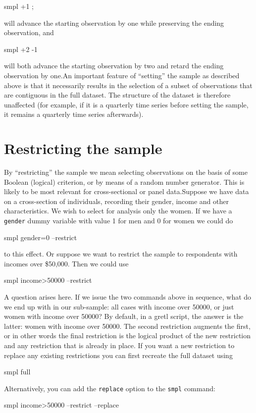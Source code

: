       
\begin{code}
	smpl +1 ;
\end{code}
will advance the starting observation by one while preserving the
ending observation, and

      
\begin{code}
	smpl +2 -1
\end{code}
will both advance the starting observation by two and retard the
ending observation by one.An important feature of ``setting'' the
sample as described above is that it necessarily results in the
selection of a subset of observations that are contiguous in the full
dataset. The structure of the dataset is therefore unaffected (for
example, if it is a quarterly time series before setting the sample,
it remains a quarterly time series afterwards).

\section{Restricting the sample}
\label{sample-restrict}

By ``restricting'' the sample we mean selecting observations on the
basis of some Boolean (logical) criterion, or by means of a random
number generator.  This is likely to be most relevant for
cross-sectional or panel data.Suppose we have data on a cross-section
of individuals, recording their gender, income and other
characteristics.  We wish to select for analysis only the women.  If
we have a \verb+gender+ dummy variable with value 1 for men and 0 for
women we could do
%      
\begin{code}
	smpl gender=0 --restrict
\end{code}
%
to this effect.  Or suppose we want to restrict the sample to
respondents with incomes over \$50,000.  Then we could use
%
\begin{code}
	smpl income>50000 --restrict
\end{code}

A question arises here.  If we issue the two commands above in
sequence, what do we end up with in our sub-sample: all cases with
income over 50000, or just women with income over 50000? By default,
in a gretl script, the answer is the latter: women with income over
50000.  The second restriction augments the first, or in other words
the final restriction is the logical product of the new restriction
and any restriction that is already in place.  If you want a new
restriction to replace any existing restrictions you can first
recreate the full dataset using
%
\begin{code}
      smpl full
\end{code}
%
Alternatively, you can add the \verb+replace+ option to the
\verb+smpl+ command:
%
\begin{code}
      smpl income>50000 --restrict --replace
\end{code}

